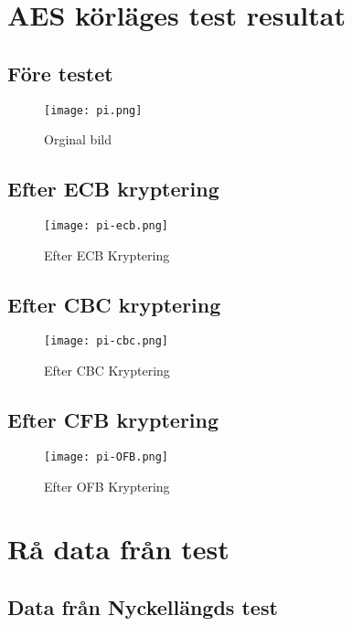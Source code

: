 \appendix

\chapter{AES körläges test resultat}
\label{app:raw-data-mode-picture-test}

\section{Före testet}
\begin{figure}[H]
  \centering
  \texttt{[image: pi.png]}
  \caption{Orginal bild}
  \label{fig:pi-original}
\end{figure}

\section{Efter ECB kryptering}
\begin{figure}[H]
  \centering
  \texttt{[image: pi-ecb.png]}
  \caption{Efter ECB Kryptering}
  \label{fig:pi-ecb}
\end{figure}

\section{Efter CBC kryptering}
\begin{figure}[H]
  \centering
  \texttt{[image: pi-cbc.png]}
  \caption{Efter CBC Kryptering}
  \label{fig:pi-cbc}
\end{figure}

\section{Efter CFB kryptering}
\begin{figure}[H]
  \centering
  \texttt{[image: pi-OFB.png]}
  \caption{Efter OFB Kryptering}
  \label{fig:pi-ofb}
\end{figure}

\cleardoublepage

\chapter{Rå data från test}
\label{app:raw-data}

\section{Data från Nyckellängds test}
\label{app:raw-data-keylength}

